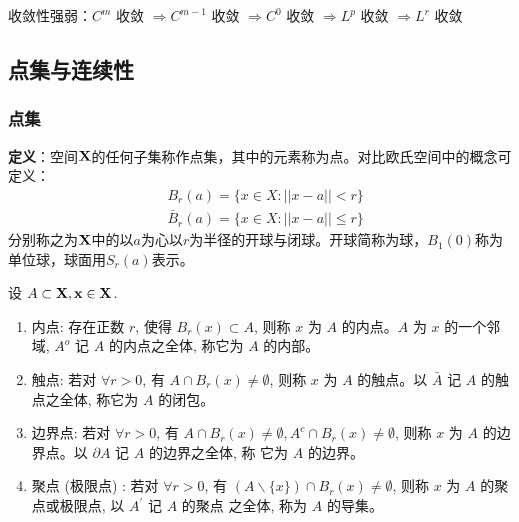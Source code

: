 \documentclass[12pt,a4paper]{article}
\begin{document}
收敛性强弱：$C^{m}$ 收敛 $\Rightarrow C^{m-1}$ 收敛 $\Rightarrow C^{0}$ 收敛 $\Rightarrow L^{p}$ 收敛 $\Rightarrow L^{r}$ 收敛

\subsection{点集与连续性}
\subsubsection{点集}
\textbf{定义}：空间$\bf{X}$的任何子集称作点集，其中的元素称为点。对比欧氏空间中的概念可定义：
\begin{equation}
\begin{aligned}
&B_{r}(a)=\{x \in X:|| x-a||<r\} \\
&\bar{B}_{r}(a)=\{x \in X:|| x-a|| \leq r\}
\end{aligned}
\end{equation}
分别称之为$\bf{X}$中的以$a$为心以$r$为半径的开球与闭球。开球简称为球，$B_1(0)$称为单位球，球面用$S_r(a)$表示。

设 $A \subset \bf{X}, x \in \bf{X}$.
\begin{enumerate}
	\item 内点: 存在正数 $r$, 使得 $B_{r}(x) \subset A$, 则称 $x$ 为 $A$ 的内点。$A$ 为 $x$ 的一个邻域, $A^{o}$ 记 $A$ 的内点之全体, 称它为 $A$ 的内部。
	\item 触点: 若对 $\forall r>0$, 有 $A \cap B_{r}(x) \neq \emptyset$, 则称 $x$ 为 $A$ 的触点。以 $\bar{A}$ 记 $A$ 的触点之全体, 称它为 $A$ 的闭包。
	\item 边界点: 若对 $\forall r>0$, 有 $A \cap B_{r}(x) \neq \emptyset, A^{c} \cap B_{r}(x) \neq \emptyset$,
则称 $x$ 为 $A$ 的边界点。以 $\partial A$ 记 $A$ 的边界之全体, 称 它为 $A$ 的边界。
	\item 聚点 (极限点) : 若对 $\forall r>0$, 有 $(A \backslash\{x\}) \cap B_{r}(x) \neq \emptyset$,
则称 $x$ 为 $A$ 的聚点或极限点, 以 $A^{\prime}$ 记 $A$ 的聚点 之全体, 称为 $A$ 的导集。
\end{enumerate}
\end{document}
